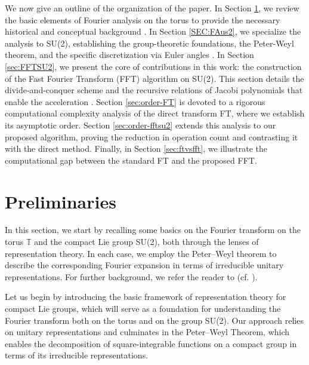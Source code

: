 \documentclass[11pt]{article}
\theoremstyle{definition}
\theoremstyle{remark}
\numberwithin{equation}{section}
\begin{document}
We now give an outline of the organization of the paper. In Section \ref{SEC:Prelim}, we review the basic elements of Fourier analysis on the torus to provide the necessary historical and conceptual background \cite{Toro1,Toro2, Cooley-Tukey}. In Section \ref{SEC:FAus2}, we specialize the analysis to SU(2), establishing the group-theoretic foundations, the Peter-Weyl theorem, and the specific discretization via Euler angles \cite{Faraut_2008,ruzhansky2009pseudo,Preli}. In Section \ref{sec:FFTSU2}, we present the core of contributions in this work: the construction of the Fast Fourier Transform (FFT) algorithm on SU(2). This section details the divide-and-conquer scheme and the recursive relations of Jacobi polynomials that enable the acceleration \cite{2-sphere,Quantum_SU(2),FFT_Compact_Groups}. Section \ref{sec:order-FT} is devoted to a rigorous computational complexity analysis of the direct transform FT, where we establish its asymptotic order. Section \ref{sec:order-fftsu2} extends this analysis to our proposed algorithm, proving the reduction in operation count and contrasting it with the direct method. Finally, in Section \ref{sec:ftvsfft}, we illustrate the computational gap between the standard FT and the proposed FFT.



\section{Preliminaries}  
\label{SEC:Prelim}
In this section, we start by recalling some basics on the Fourier transform on the torus \( \mathbb{T} \) and the compact Lie group SU(2), both through the lenses of representation theory. In each case, we employ the Peter–Weyl theorem to describe the corresponding Fourier expansion in terms of irreducible unitary representations. For further background, we refer the reader to (cf. \cite{FFT_Compact_Groups}).
\medskip


Let us begin by introducing the basic framework of representation theory for compact Lie groups, which will serve as a foundation for understanding the Fourier transform both on the torus and on the group SU(2). Our approach relies on unitary representations and culminates in the Peter–Weyl Theorem, which enables the decomposition of square-integrable functions on a compact group in terms of its irreducible representations.\\
\end{document}
